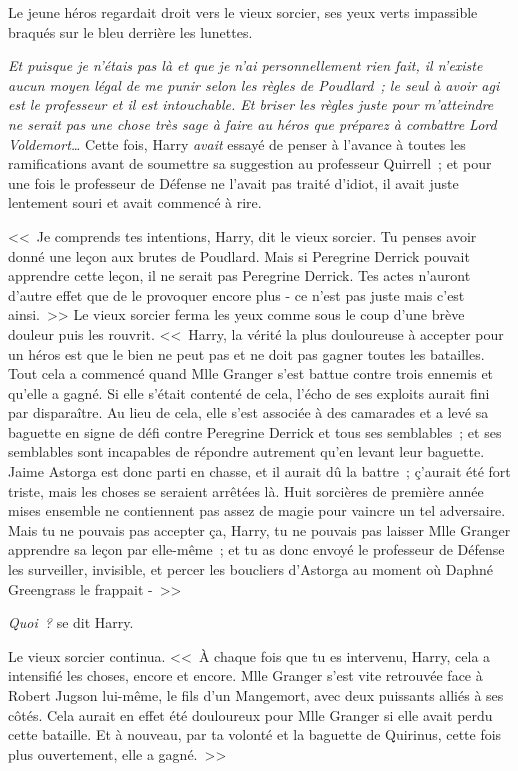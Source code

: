 Le jeune héros regardait droit vers le vieux sorcier, ses yeux verts impassible braqués sur le bleu derrière les lunettes.

\emph{Et puisque je n'étais pas là et que je n'ai personnellement rien fait, il n'existe aucun moyen légal de me punir selon les règles de Poudlard~; le seul à avoir agi est le professeur et il est intouchable. Et briser les règles juste pour m'atteindre ne serait pas une chose très sage à faire au héros que préparez à combattre Lord Voldemort…} Cette fois, Harry \emph{avait} essayé de penser à l'avance à toutes les ramifications avant de soumettre sa suggestion au professeur Quirrell~; et pour une fois le professeur de Défense ne l'avait pas traité d'idiot, il avait juste lentement souri et avait commencé à rire.

<<~Je comprends tes intentions, Harry, dit le vieux sorcier. Tu penses avoir donné une leçon aux brutes de Poudlard. Mais si Peregrine Derrick pouvait apprendre cette leçon, il ne serait pas Peregrine Derrick. Tes actes n'auront d'autre effet que de le provoquer encore plus - ce n'est pas juste mais c'est ainsi.~>> Le vieux sorcier ferma les yeux comme sous le coup d'une brève douleur puis les rouvrit. <<~Harry, la vérité la plus douloureuse à accepter pour un héros est que le bien ne peut pas et ne doit pas gagner toutes les batailles. Tout cela a commencé quand Mlle Granger s'est battue contre trois ennemis et qu'elle a gagné. Si elle s'était contenté de cela, l'écho de ses exploits aurait fini par disparaître. Au lieu de cela, elle s'est associée à des camarades et a levé sa baguette en signe de défi contre Peregrine Derrick et tous ses semblables~; et ses semblables sont incapables de répondre autrement qu'en levant leur baguette. Jaime Astorga est donc parti en chasse, et il aurait dû la battre~; ç'aurait été fort triste, mais les choses se seraient arrêtées là. Huit sorcières de première année mises ensemble ne contiennent pas assez de magie pour vaincre un tel adversaire. Mais tu ne pouvais pas accepter ça, Harry, tu ne pouvais pas laisser Mlle Granger apprendre sa leçon par elle-même~; et tu as donc envoyé le professeur de Défense les surveiller, invisible, et percer les boucliers d'Astorga au moment où Daphné Greengrass le frappait -~>>

\emph{Quoi~?} se dit Harry.

Le vieux sorcier continua. <<~À chaque fois que tu es intervenu, Harry, cela a intensifié les choses, encore et encore. Mlle Granger s'est vite retrouvée face à Robert Jugson lui-même, le fils d'un Mangemort, avec deux puissants alliés à ses côtés. Cela aurait en effet été douloureux pour Mlle Granger si elle avait perdu cette bataille. Et à nouveau, par ta volonté et la baguette de Quirinus, cette fois plus ouvertement, elle a gagné.~>>

